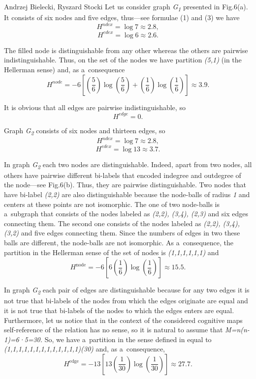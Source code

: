 \begin{artengenv2auth}{Andrzej Bielecki, Ryszard Stocki}
Let us consider graph \textit{G}\textit{\textsubscript{1}} presented in Fig.6(a). It consists of six nodes and five edges, thus---see formulae (1) and (3) we have
\[
H^{\textit{ndex}} = \log 7 \approx 2.8,
\]
\[
H^{\textit{edex}} = \log 6 \approx 2.6.
\]

The filled node is distinguishable from any other whereas the others are pairwise indistinguishable. Thus, on the set of the nodes we have partition \textit{(5,1)} (in the Hellerman sense) and, as a~consequence
\[
H^{\textit{node}} = -6 \left[ \left(\frac{5}{6}\right) \log\left(\frac{5}{6}\right) + \left(\frac{1}{6}\right) \log\left(\frac{1}{6}\right) \right] \approx 3.9.
\]

It is obvious that all edges are pairwise indistinguishable, so
\[
H^{\textit{edge}} = 0.
\]

Graph \textit{G}\textit{\textsubscript{2}} consists of six nodes and thirteen edges, so
\[
H^{\textit{ndex}} = \log 7 \approx 2.8,
\]
\[
H^{\textit{edex}} = \log 13 \approx 3.7.
\]

In graph \textit{G}\textit{\textsubscript{2}} each two nodes are distinguishable. Indeed, apart from two nodes, all others have pairwise different bi-labels that encoded indegree and outdegree of the node---see Fig.6(b). Thus, they are pairwise distinguishable. Two nodes that have bi-label \textit{(2,2)} are also distinguishable because the node-balls of radius \textit{1} and centers at these points are not isomorphic. The one of two node-balls is a~subgraph that consists of the nodes labeled as \textit{(2,2), (3,4), (2,3)} and six edges connecting them. The second one consists of the nodes labeled as \textit{(2,2), (3,4), (3,2)} and five edges connecting them. Since the numbers of edges in two these balls are different, the node-balls are not isomorphic. As a~consequence, the partition in the Hellerman sense of the set of nodes is \textit{(1,1,1,1,1,1)} and
\[
H^{\text{node}} = -6 \left[ 6 \left(\frac{1}{6}\right) \log\left(\frac{1}{6}\right) \right] \approx 15.5.
\]

In graph \textit{G}\textit{\textsubscript{2}} each pair of edges are distinguishable because for any two edges it is not true that bi-labels of the nodes from which the edges originate are equal and it is not true that bi-labels of the nodes to which the edges enters are equal. Furthermore, let us notice that in the context of the considered cognitive maps self-reference of the relation has no sense, so it is natural to assume that \textit{M=n(n-1)=6·5=30.} So, we have a~partition in the sense defined in 
\parencite[][]{bielecki_information_2022} %
 equal to \textit{(1,1,1,1,1,1,1,1,1,1,1,1,1)(30)} and, as a~consequence,
\[
H^{\text{edge}} = -13 \left[ 13 \left(\frac{1}{30}\right) \log\left(\frac{1}{30}\right) \right] \approx 27.7.
\]


\end{artengenv2auth}
